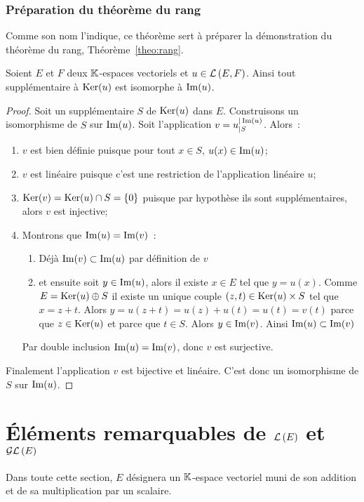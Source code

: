 \subsubsection{Préparation du théorème du rang}
Comme son nom l'indique, ce théorème sert à préparer la démonstration du 
théorème du rang, Théorème~\ref{theo:rang}.
\begin{theo}\label{theo:preptheorang}
  Soient \(E\) et \(F\) deux \(\mathbb{K}\)-espaces vectoriels et \(u \in \mathcal{L}\left(E,F\right)\). 
  Ainsi tout supplémentaire à \(\operatorname{Ker}(u)\) est isomorphe à \(\operatorname{Im}(u)\).
\end{theo}
\begin{proof}
  Soit un supplémentaire \(S\) de \(\operatorname{Ker}(u)\) dans \(E\). Construisons un 
  isomorphisme de \(S\) sur \(\operatorname{Im}(u)\). Soit l'application 
  \(v=u_{|S}^{|\operatorname{Im}(u)}\). Alors~:
  \begin{enumerate}
    \item \(v\) est bien définie puisque pour tout \(x \in S\), \(u(x) \in 
      \operatorname{Im}(u)\);
    \item \(v\) est linéaire puisque c'est une restriction de l'application 
      linéaire \(u\);
    \item \(\operatorname{Ker}(v)=\operatorname{Ker}(u) \cap S =\{0\}\) puisque par hypothèse ils sont 
      supplémentaires, alors \(v\) est injective;
    \item Montrons que \(\operatorname{Im}(u)=\operatorname{Im}(v)\)~:
      \begin{enumerate}
        \item Déjà \(\operatorname{Im}(v) \subset \operatorname{Im}(u)\) par définition de \(v\)
        \item et ensuite soit \(y \in \operatorname{Im}(u)\), alors il existe \(x \in E\) 
          tel que \(y=u(x)\). Comme \(E=\operatorname{Ker}(u) \oplus S\) il existe un unique 
          couple \((z,t) \in \operatorname{Ker}(u) \times S\) tel que \(x=z+t\). Alors 
          \(y=u(z+t)=u(z)+u(t)=u(t)=v(t)\) parce que \(z \in \operatorname{Ker}(u)\) et parce 
          que \(t \in S\). Alors \(y \in \operatorname{Im}(v)\). Ainsi \(\operatorname{Im}(u) \subset 
          \operatorname{Im}(v)\)
      \end{enumerate}
      Par double inclusion \(\operatorname{Im}(u)=\operatorname{Im}(v)\), donc \(v\) est surjective.
  \end{enumerate}
  Finalement l'application \(v\) est bijective et linéaire. C'est donc un 
  isomorphisme de \(S\) sur \(\operatorname{Im}(u)\).
\end{proof}

\section{Éléments remarquables de \(\mathcal{L}\left(E\right)\) et \(\mathcal{GL}\left(E\right)\)}
Dans toute cette section, \(E\) désignera un \(\mathbb{K}\)-espace vectoriel muni de son 
addition et de sa multiplication par un scalaire.
